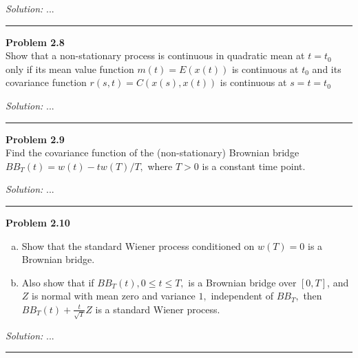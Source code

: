 \documentclass[a4paper, 11pt]{article}
\newenvironment{problem}[2][Problem]
    { \begin{mdframed}[backgroundcolor=gray!20] \textbf{#1 #2} \\}
    {  \end{mdframed}}
\newenvironment{solution}
    {\textit{Solution:}}
    {}
\begin{document}
\begin{solution}
...
\end{solution}

\noindent\rule{7in}{2.8pt}
\begin{problem}{2.8}

Show that a non-stationary process is continuous in quadratic mean at $t=t_{0}$ only if its mean value function $m(t)=E(x(t))$ is continuous at $t_{0}$ and its covariance function $r(s, t)=C(x(s), x(t))$ is continuous at $s=t=t_{0}$

\end{problem}

\begin{solution}
...
\end{solution}

\noindent\rule{7in}{2.8pt}
\begin{problem}{2.9}

Find the covariance function of the (non-stationary) Brownian bridge $B B_{T}(t)=w(t)-t w(T) / T,$ where $T>0$ is a constant time point.

\end{problem}

\begin{solution}
...
\end{solution}

\noindent\rule{7in}{2.8pt}
\begin{problem}{2.10}
  
  \begin{enumerate}[a)]
    \item Show that the standard Wiener process conditioned on $w(T)=0$ is a Brownian bridge.
    \item  Also show that if $B B_{T}(t), 0 \leq t \leq T,$ is a Brownian bridge over $[0, T]$, and $Z$ is normal with mean zero and variance $1,$ independent of $B B_{T},$ then $B B_{T}(t)+\frac{t}{\sqrt{T}} Z$ is a standard Wiener process.
  \end{enumerate}

\end{problem}

\begin{solution}
...
\end{solution}

\noindent\rule{7in}{2.8pt}
\end{document}
